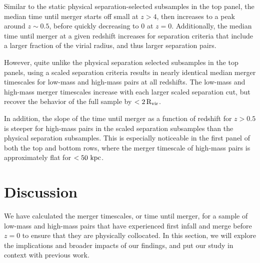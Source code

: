 \documentclass[twocolumn,linenumbers]{aastex631}
\begin{document}
        Similar to the static physical separation-selected subsamples in the top panel, the median time until merger starts off small at $z>4$, then increases to a peak around $z\sim0.5$, before quickly decreasing to 0 at $z=0$. 
        Additionally, the median time until merger at a given redshift increases for separation criteria that include a larger fraction of the virial radius, and thus larger separation pairs. 
        
        However, quite unlike the physical separation selected subsamples in the top panels, using a scaled separation criteria results in nearly identical median merger timescales for low-mass and high-mass pairs at all redshifts.
        The low-mass and high-mass merger timescales increase with each larger scaled separation cut, but recover the behavior of the full sample by $<2\,\rm R_{vir}$.
        
        In addition, the slope of the time until merger as a function of redshift for $z>0.5$ is steeper for high-mass pairs in the scaled separation subsamples than the physical separation subsamples.
        This is especially noticeable in the first panel of both the top and bottom rows, where the merger timescale of high-mass pairs is approximately flat for $<50\,\mathrm{\,kpc}$. 
    
    

\section{Discussion} \label{sec:discussion}
    We have calculated the merger timescales, or time until merger, for a sample of low-mass and high-mass pairs that have experienced first infall and merge before $z=0$ to ensure that they are physically collocated.
    In this section, we will explore the implications and broader impacts of our findings, and put our study in context with previous work. 
    
\end{document}
